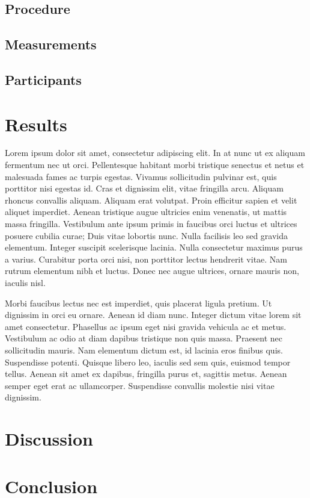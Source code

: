 \section{Procedure}

\section{Measurements}

\section{Participants}

\chapter{Results}

Lorem ipsum dolor sit amet, consectetur adipiscing elit. In at nunc ut ex aliquam fermentum nec ut orci. Pellentesque habitant morbi tristique senectus et netus et malesuada fames ac turpis egestas. Vivamus sollicitudin pulvinar est, quis porttitor nisi egestas id. Cras et dignissim elit, vitae fringilla arcu. Aliquam rhoncus convallis aliquam. Aliquam erat volutpat. Proin efficitur sapien et velit aliquet imperdiet. Aenean tristique augue ultricies enim venenatis, ut mattis massa fringilla. Vestibulum ante ipsum primis in faucibus orci luctus et ultrices posuere cubilia curae; Duis vitae lobortis nunc. Nulla facilisis leo sed gravida elementum. Integer suscipit scelerisque lacinia. Nulla consectetur maximus purus a varius. Curabitur porta orci nisi, non porttitor lectus hendrerit vitae. Nam rutrum elementum nibh et luctus. Donec nec augue ultrices, ornare mauris non, iaculis nisl.

Morbi faucibus lectus nec est imperdiet, quis placerat ligula pretium. Ut dignissim in orci eu ornare. Aenean id diam nunc. Integer dictum vitae lorem sit amet consectetur. Phasellus ac ipsum eget nisi gravida vehicula ac et metus. Vestibulum ac odio at diam dapibus tristique non quis massa. Praesent nec sollicitudin mauris. Nam elementum dictum est, id lacinia eros finibus quis. Suspendisse potenti. Quisque libero leo, iaculis sed sem quis, euismod tempor tellus. Aenean sit amet ex dapibus, fringilla purus et, sagittis metus. Aenean semper eget erat ac ullamcorper. Suspendisse convallis molestie nisi vitae dignissim.



\chapter{Discussion}

\chapter{Conclusion}
\label{sec:conclusion}

